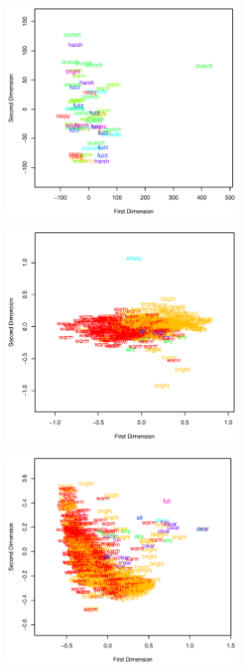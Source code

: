 	\begin{figure}[h!]
		\centering
		\includegraphics[width=0.6\textwidth]{chapter4/Images/DistortionProcessedTSNE.eps}
		\caption{}
		\label{fig:DistortionProcessedTSNE}
	\end{figure}

	\begin{figure}[h!]
		\centering
		\includegraphics[width=0.6\textwidth]{chapter4/Images/EqualiserDifferenceMDS.eps}
		\caption{}
		\label{fig:EqualiserDifferenceMDS}
	\end{figure}

	\begin{figure}[h!]
		\centering
		\includegraphics[width=0.6\textwidth]{chapter4/Images/EqualiserProcessedMDS.eps}
		\caption{}
		\label{fig:EqualiserProcessedMDS}
	\end{figure}
